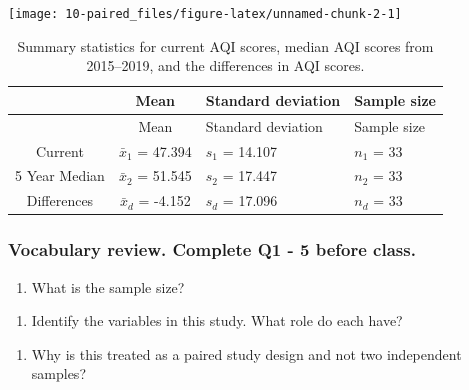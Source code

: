 \documentclass[
]{report}
\providecommand{\tightlist}{%
  \setlength{\itemsep}{0pt}\setlength{\parskip}{0pt}}
\begin{document}
\vspace{.05in}

\begin{center}\texttt{[image: 10-paired\_files/figure-latex/unnamed-chunk-2-1]} \end{center}

\vspace{.2in}

\begin{longtable}[]{@{}ccll@{}}
\caption{Summary statistics for current AQI scores, median AQI scores from 2015--2019, and the differences in AQI scores.}\tabularnewline
\toprule
& Mean & Standard deviation & Sample size\tabularnewline
\midrule
\endfirsthead
\toprule
& Mean & Standard deviation & Sample size\tabularnewline
\midrule
\endhead
Current & \(\bar{x}_1\) = 47.394 & \(s_1\) = 14.107 & \(n_1\) = 33\tabularnewline
5 Year Median & \(\bar{x}_2\) = 51.545 & \(s_2\) = 17.447 & \(n_2\) = 33\tabularnewline
Differences & \(\bar{x}_d\) = -4.152 & \(s_d\) = 17.096 & \(n_d\) = 33\tabularnewline
\bottomrule
\end{longtable}

\newpage

\hypertarget{vocabulary-review.-complete-q1---5-before-class.}{%
\subsubsection*{Vocabulary review. Complete Q1 - 5 before class.}\label{vocabulary-review.-complete-q1---5-before-class.}}

\begin{enumerate}
\def\labelenumi{\arabic{enumi}.}
\tightlist
\item
  What is the sample size?
\end{enumerate}

\vspace{0.5in}

\begin{enumerate}
\def\labelenumi{\arabic{enumi}.}
\setcounter{enumi}{1}
\tightlist
\item
  Identify the variables in this study. What role do each have?
\end{enumerate}

\vspace{.8in}

\begin{enumerate}
\def\labelenumi{\arabic{enumi}.}
\setcounter{enumi}{2}
\tightlist
\item
  Why is this treated as a paired study design and not two independent samples?
\end{enumerate}
\end{document}
